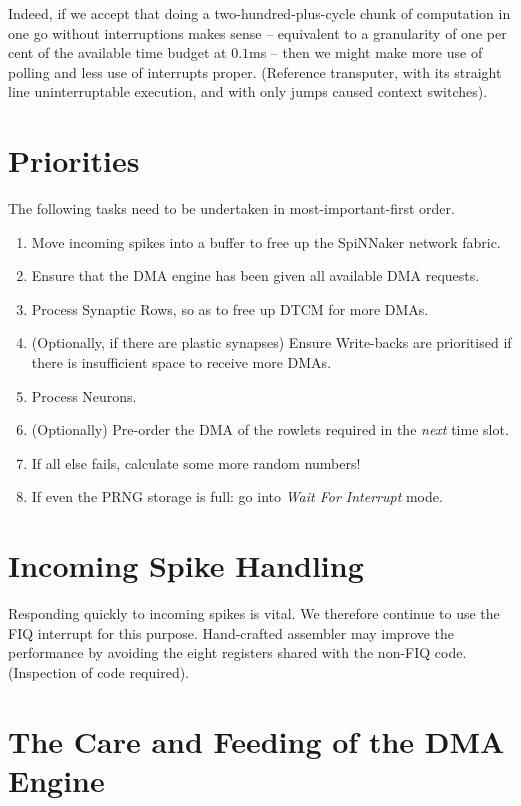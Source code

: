 Indeed, if we accept that doing a two-hundred-plus-cycle chunk of
computation in one go without interruptions makes sense -- equivalent
to a granularity of one per cent of the available time budget at
$0.1$ms -- then we might make more use of polling and less use of
interrupts proper. (Reference transputer, with its straight line
uninterruptable execution, and with only jumps caused context
switches).





\section{Priorities}\label{sc:priorities}

The following tasks need to be undertaken in most-important-first order.
\begin{enumerate}
\item Move incoming spikes into a buffer to free up the SpiNNaker
  network fabric.
\item Ensure that the DMA engine has been given all available DMA
  requests.
\item Process Synaptic Rows, so as to free up DTCM for more DMAs.
\item (Optionally, if there are plastic synapses) Ensure Write-backs
  are prioritised if there is insufficient space to receive more DMAs.
\item Process Neurons.
\item (Optionally) Pre-order the DMA of the rowlets required in the
  {\em next} time slot.
\item If all else fails, calculate some more random numbers!
\item If even the PRNG storage is full: go into {\it Wait For
    Interrupt} mode.
\end{enumerate}

\section{Incoming Spike Handling}

Responding quickly to incoming spikes is vital. We therefore continue
to use the FIQ interrupt for this purpose. Hand-crafted assembler may
improve the performance by avoiding the eight registers shared with
the non-FIQ code. (Inspection of code required).

\section{The Care and Feeding of the DMA Engine}

